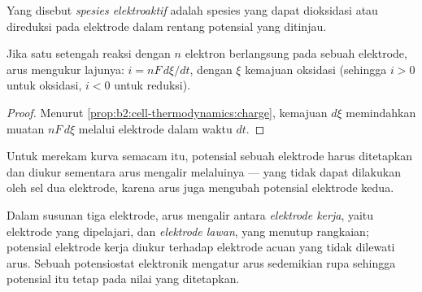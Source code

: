 \begin{definition}\label{def:b2:current-potential-curves:electroactive}
Yang disebut \emph{spesies elektroaktif}
adalah spesies yang dapat dioksidasi atau direduksi pada elektrode dalam
rentang potensial yang ditinjau.
\end{definition}

\begin{proposition}\label{prop:b2:current-potential-curves:current-rate}
Jika satu setengah reaksi dengan $n$ elektron berlangsung pada sebuah
elektrode, arus mengukur lajunya: $i = nF\,d\xi/dt$, dengan $\xi$ kemajuan
oksidasi (sehingga $i > 0$ untuk oksidasi, $i < 0$ untuk reduksi).
\end{proposition}

\begin{proof}
Menurut \cref{prop:b2:cell-thermodynamics:charge}, kemajuan $d\xi$
memindahkan muatan $nF\,d\xi$ melalui elektrode dalam waktu $dt$.
\end{proof}

Untuk merekam kurva semacam itu, potensial sebuah elektrode harus
ditetapkan dan diukur sementara arus mengalir melaluinya --- yang tidak
dapat dilakukan oleh sel dua elektrode, karena arus juga mengubah potensial
elektrode kedua.

\begin{definition}\label{def:b2:current-potential-curves:set-up}
Dalam susunan tiga elektrode, arus mengalir antara \emph{elektrode
kerja}, yaitu elektrode yang dipelajari, dan \emph{elektrode lawan},
yang menutup rangkaian; potensial elektrode kerja diukur terhadap
elektrode acuan yang tidak dilewati arus. Sebuah potensiostat elektronik
mengatur arus sedemikian rupa sehingga potensial itu tetap pada nilai yang
ditetapkan.
\end{definition}


